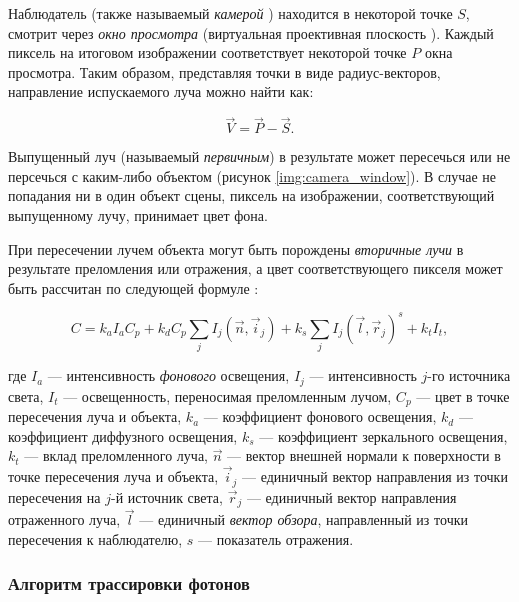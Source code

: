 Наблюдатель (также называемый \textit{камерой} \cite{gambetta_cg}) находится в некоторой точке $S$, смотрит через \textit{окно просмотра} (виртуальная проективная плоскость \cite{nikulin_optic_effects}). Каждый пиксель на итоговом изображении соответствует некоторой точке $P$ окна просмотра. Таким образом, представляя точки в виде радиус-векторов, направление испускаемого луча можно найти как: 

\begin{equation}
	\label{eq:ray_tracing_direction}
	\vec{V} = \vec{P} - \vec{S}.
\end{equation}

Выпущенный луч (называемый \textit{первичным}) в результате может пересечься или не персечься с каким-либо объектом (рисунок \ref{img:camera_window}). В случае не попадания ни в один объект сцены, пиксель на изображении, соответствующий выпущенному лучу, принимает цвет фона.


При пересечении лучем объекта могут быть порождены \textit{вторичные лучи} в результате преломления или отражения, а цвет соответствующего пикселя может быть рассчитан по следующей формуле \cite{boreskov_cg, rogers, whitted_illum}:

\begin{equation}
	\label{eq:ray_tracing_color}
	C = k_a I_a C_p + k_d C_p \sum_{j} I_j (\vec{n}, \vec{i}_j) + k_s \sum_{j} I_j (\vec{l}, \vec{r}_j)^s + k_t I_t,
\end{equation}

где $I_a$ --- интенсивность \textit{фонового} освещения, $I_j$ --- интенсивность $j$-го источника света, $I_t$ --- освещенность, переносимая преломленным лучом, $C_p$ --- цвет в точке пересечения луча и объекта, $k_a$ --- коэффициент фонового освещения, $k_d$ --- коэффициент диффузного освещения, $k_s$ --- коэффициент зеркального освещения, $k_t$ --- вклад преломленного луча, $\vec{n}$ --- вектор внешней нормали к поверхности в точке пересечения луча и объекта, $\vec{i}_j$ --- единичный вектор направления из точки пересечения на $j$-й источник света, $\vec{r}_j$ --- единичный вектор направления отраженного луча, $\vec{l}$ --- единичный \textit{вектор обзора}, направленный из точки пересечения к наблюдателю, $s$ --- показатель отражения.


\subsubsection{Алгоритм трассировки фотонов}

